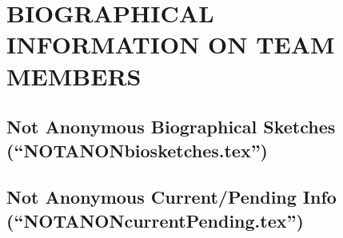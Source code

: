 \documentclass[usenames,dvipsnames,modern]{CLASS_FILES/aastex631}
\begin{document}
\def\NameBoldface#1{\textbf{#1}} %
%


\newpage
{\mbox{} \vfill \section{BIOGRAPHICAL INFORMATION ON TEAM MEMBERS} \vfill \mbox{}}

\newpage
\subsection{\textbf{Not} Anonymous Biographical Sketches (``NOTANONbiosketches.tex'')}

\def\NameBoldface#1{\textbf{#1}} %
\def\NameColor{Blue} %
\def\NameSize{\large } %
\def\LabelBoldface#1{\textbf{#1}} %
\def\SectionSpacing{\par \vspace{-0.5em}} %
\def\PublicationBullet{{\scriptsize{$\bullet$}} } %
%
\clearpage  %


\newpage
\subsection{\textbf{Not} Anonymous Current/Pending Info (``NOTANONcurrentPending.tex'')}
\end{document}
